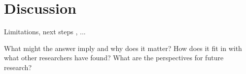 \chapter{Discussion}

Limitations, next steps , ...

What might the answer imply and why does it matter?
How does it fit in with what other researchers have found?
What are the perspectives for future research?
